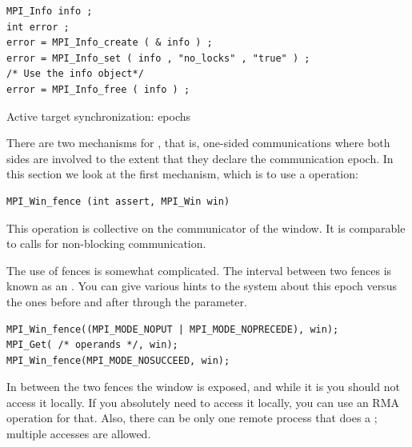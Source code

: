 \begin{verbatim}
MPI_Info info ;
int error ;
error = MPI_Info_create ( & info ) ;
error = MPI_Info_set ( info , "no_locks" , "true" ) ;
/* Use the info object*/
error = MPI_Info_free ( info ) ;
\end{verbatim}

 {Active target synchronization: epochs}

There are two mechanisms for , that is,
one-sided communications where both sides are involved to the extent that they declare
the communication epoch. In this section we look at the first mechanism,
which is to use a  operation:
\begin{verbatim}
MPI_Win_fence (int assert, MPI_Win win)
\end{verbatim}
This operation is collective on the communicator of the window.
It is comparable to  calls for non-blocking communication.

The use of fences is somewhat complicated. The interval between two fences
is known as an .
You can give various hints to the system about this epoch versus the ones
before and after through the  parameter.
\begin{verbatim}
MPI_Win_fence((MPI_MODE_NOPUT | MPI_MODE_NOPRECEDE), win);
MPI_Get( /* operands */, win);
MPI_Win_fence(MPI_MODE_NOSUCCEED, win);
\end{verbatim}
In between the two fences the window is exposed, and while it is you
should not access it locally. If you absolutely need to access it
locally, you can use an \ac{RMA} operation for that. Also, there can be only one
remote process that does a ; multiple  accesses are allowed.

